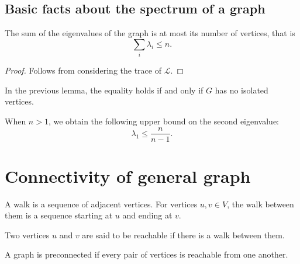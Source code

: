 \section{Basic facts about the spectrum of a graph}

\begin{lemma}
\label{lem:eigval_sum_le_n}
\leanok
The sum of the eigenvalues of the graph is at most its number of vertices, that is
\[
\sum_{i}{\lambda_i} \le n.
\]
\end{lemma}

\begin{proof}
Follows from considering the trace of $\mathcal{L}$.
\end{proof}



\begin{lemma}
\label{lem:eigval_sum_eq_n_iff_no_isolation}
\leanok
In the previous lemma, the equality holds if and only if $G$ has no isolated vertices.
\end{lemma}



\begin{lemma}
\label{lem:second_eigval_le_div}
When $n>1$, we obtain the following upper bound on the second eigenvalue:
\[
\lambda_1 \le \frac{n}{n-1}.
\]
\end{lemma}




\chapter{Connectivity of general graph}

\begin{definition}[Walk]
\label{def:Walk}
\leanok
A walk is a sequence of adjacent vertices. For vertices $u, v \in V$, the walk between them is a sequence starting at $u$ and ending at $v$.
\end{definition}

\begin{definition}[Reachable]
\label{def:Reachable}
\leanok
Two vertices $u$ and $v$ are said to be reachable if there is a walk between them.
\end{definition}

\begin{definition}[Preconnected]
\label{def:Preconnected}
\leanok
A graph is preconnected if every pair of vertices is reachable from one another.
\end{definition}

